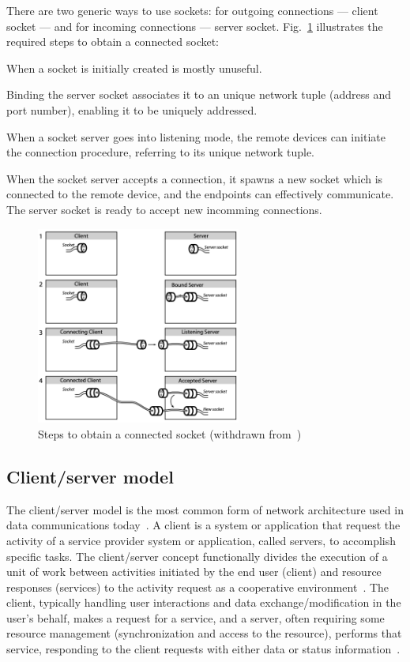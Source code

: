 There are two generic ways to use sockets: for outgoing connections --- client
socket --- and for incoming connections --- server
socket. Fig.~\ref{fig:sockets-connection} illustrates the required steps to
obtain a connected socket:
\begin{enum-c}
\item When a socket is initially created is mostly unuseful.
\item Binding the server socket associates it to an unique network tuple (address and
  port number), enabling it to be uniquely addressed.
\item When a socket server goes into listening mode, the remote devices can
  initiate the connection procedure, referring to its unique network tuple.
\item When the socket server accepts a connection, it spawns a new socket which
  is connected to the remote device, and the endpoints can effectively
  communicate. The server socket is ready to accept new incomming connections.
\end{enum-c}
\begin{figure}[!hbt]
\centering
    \includegraphics[width=0.6\textwidth]{./img/sockets-connection.png}
  \caption{Steps to obtain a connected socket (withdrawn from~\cite{huang2007bluetooth})}%
\label{fig:sockets-connection}
\end{figure}

\subsection{Client/server model}%
\label{sec:client-serv-model}
The client/server model is the most common form of network architecture used
in data communications today~\cite{hanson2000client}. A client is a system or
application that request the activity of a service provider system or
application, called servers, to accomplish specific tasks.
The client/server concept functionally divides the execution of a unit
of work between activities initiated by the end user (client) and resource responses
(services) to the activity request as a cooperative environment~\cite{hanson2000client}. The client,
typically handling user interactions and data exchange/modification in the user’s
behalf, makes a request for a service, and a server, often requiring some resource
management (synchronization and access to the resource), performs that service,
responding to the client requests with either data or status information~\cite{ibmCliServ}.

